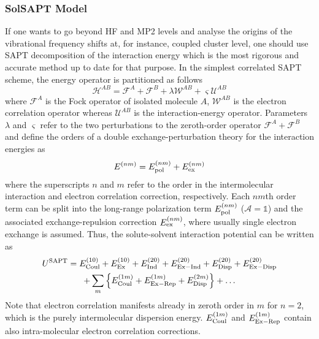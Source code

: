 \documentclass[a4paper,titlepage,twoside,fleqn,12pt]{book}
\begin{document}
\begin{refsection}
\subsubsection{SolSAPT Model\label{s:solsapt}}

If one wants to go beyond HF and MP2 levels and
analyse the origins of the vibrational frequency 
shifts at, for instance, coupled cluster
level, one should use SAPT decomposition of the interaction
energy which is
the most rigorous and accurate method up to date for that purpose.
In the simplest correlated SAPT scheme, the energy operator
is partitioned as follows
%
\begin{equation}
 \mathscr{H}^{AB} = \mathscr{F}^{A} + \mathscr{F}^{B} + \lambda \mathscr{W}^{AB} + \varsigma \mathscr{U}^{AB}
\end{equation}
%
where $\mathscr{F}^{A}$ is the Fock operator of isolated molecule $A$, 
$\mathscr{W}^{AB}$ is the electron correlation operator 
whereas $\mathscr{U}^{AB}$ is the interaction\hyp{}energy operator.
Parameters $\lambda$ and $\varsigma$ refer to the two perturbations
to the zeroth\hyp{}order operator $\mathscr{F}^{A}+\mathscr{F}^{B}$
and define the orders of a double exchange\hyp{}perturbation theory
for the interaction energies as
%
\begin{equation}
  E^{(nm)} =  E^{(nm)}_{\rm pol} +  E^{(nm)}_{\rm ex}
\end{equation}
%
where the superscripts $n$ and $m$ refer to the order in the
intermolecular interaction and electron correlation correction,
respectively. Each $nm$th order term can be split into the long\hyp{}range
polarization term $E^{(nm)}_{\rm pol}$ ($\mathscr{A}=\mathbb{1}$)
and the associated exchange\hyp{}repulsion correction $E^{(nm)}_{\rm ex}$,
where usually single electron exchange is assumed.
Thus, the solute\hyp{}solvent interaction potential can be written as
%
\begin{multline}
U^{\rm SAPT} =
         E^{(10)}_{\rm Coul} + E^{(10)}_{\rm Ex} + 
         E^{(20)}_{\rm Ind}  + E^{(20)}_{\rm Ex-Ind} +
         E^{(20)}_{\rm Disp} + E^{(20)}_{\rm Ex-Disp} \\ +
     \sum_m \left\{ E^{(1m)}_{\rm Coul} + E^{(1m)}_{\rm Ex-Rep} + E^{(2m)}_{\rm Disp}\right\} 
     + \ldots
\end{multline}
%
Note that electron correlation manifests
already in zeroth order in $m$ for $n=2$, which is the purely intermolecular
dispersion energy. $E^{(1m)}_{\rm Coul}$ and $E^{(1m)}_{\rm Ex-Rep}$
contain also intra\hyp{}molecular electron correlation corrections.

\end{refsection}
\end{document}
